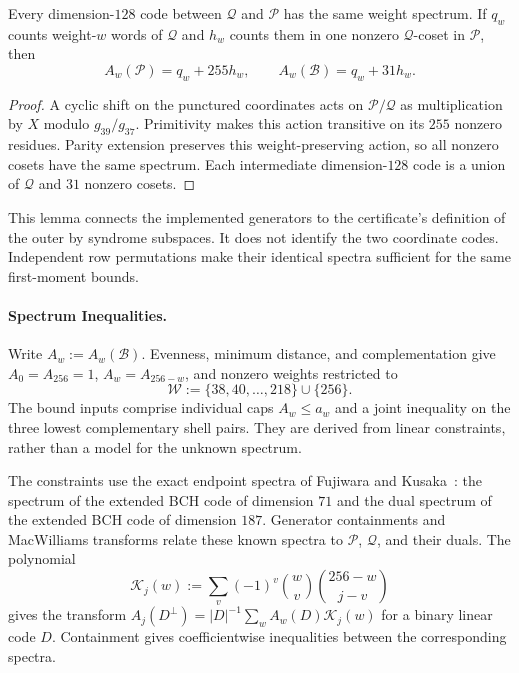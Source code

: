 \begin{lemma}
\leavevmode\par
Every dimension-$128$ code between $\mathcal Q$ and $\mathcal P$ has the same weight spectrum.
If $q_w$ counts weight-$w$ words of $\mathcal Q$ and $h_w$ counts them in one nonzero
$\mathcal Q$-coset in $\mathcal P$, then
\begin{equation}
 A_w(\mathcal P)=q_w+255h_w,\qquad A_w(\mathcal B)=q_w+31h_w.
 \label{eq:finite-quotient-spectrum}
\end{equation}
\end{lemma}
\begin{proof}
A cyclic shift on the punctured coordinates acts on $\mathcal P/\mathcal Q$ as multiplication
by $X$ modulo $g_{39}/g_{37}$. Primitivity makes this action transitive on
its $255$ nonzero residues. Parity extension preserves this weight-preserving
action, so all nonzero cosets have the same spectrum. Each intermediate
dimension-$128$ code is a union of $\mathcal Q$ and $31$ nonzero cosets.
\end{proof}

This lemma connects the implemented generators to the certificate's
definition of the outer by syndrome subspaces. It does not identify the two
coordinate codes. Independent row permutations make their identical
spectra sufficient for the same first-moment bounds.

\paragraph{Spectrum Inequalities.}
Write $A_w:=A_w(\mathcal B)$. Evenness, minimum distance, and complementation
give $A_0=A_{256}=1$, $A_w=A_{256-w}$, and nonzero weights restricted to
\[
 \mathcal W:=\{38,40,\ldots,218\}\cup\{256\}.
\]
The bound inputs comprise individual caps $A_w\le a_w$ and a joint
inequality on the three lowest complementary shell pairs. They are derived
from linear constraints, rather than a model for the unknown spectrum.

The constraints use the exact endpoint spectra of Fujiwara and
Kusaka~\cite{FujiwaraKusaka2021}: the spectrum of the extended BCH code of
dimension $71$ and the dual spectrum of the extended BCH code of dimension $187$.
Generator containments and MacWilliams transforms relate these known
spectra to $\mathcal P$, $\mathcal Q$, and their duals. The polynomial
\[
 \mathcal K_j(w):=\sum_v(-1)^v\binom wv\binom{256-w}{j-v}
\]
gives the transform
$A_j(D^\perp)=|D|^{-1}\sum_w A_w(D)\mathcal K_j(w)$ for a binary linear
code $D$. Containment gives coefficientwise inequalities between the
corresponding spectra.

